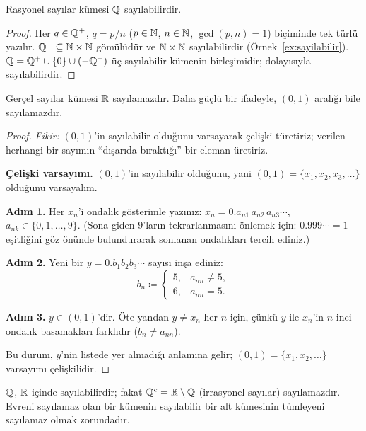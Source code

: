 \begin{teorem}[$\Q$ Sayılabilirdir]\label{thm:Qsayilabilir}
Rasyonel sayılar kümesi $\Q$ sayılabilirdir.
\end{teorem}

\begin{proof}
Her $q \in \mathbb{Q}^+$, $q = p/n$ ($p \in \mathbb{N}$, $n \in \mathbb{N}$, $\gcd(p,n) = 1$) biçiminde
tek türlü yazılır. $\mathbb{Q}^+ \subseteq \mathbb{N} \times \mathbb{N}$ gömülüdür ve $\mathbb{N} \times \mathbb{N}$
sayılabilirdir (Örnek~\ref{ex:sayilabilir}). $\mathbb{Q} = \mathbb{Q}^+ \cup \{0\} \cup (-\mathbb{Q}^+)$
üç sayılabilir kümenin birleşimidir; dolayısıyla sayılabilirdir.
\end{proof}

\begin{teorem}
\label{thm:Rsayilamaz}
Gerçel sayılar kümesi $\mathbb{R}$ sayılamazdır.
Daha güçlü bir ifadeyle, $(0,1)$ aralığı bile sayılamazdır.
\end{teorem}

\begin{proof}
\textit{Fikir:} $(0,1)$'in sayılabilir olduğunu varsayarak çelişki türetiriz;
verilen herhangi bir sayımın ``dışarıda bıraktığı'' bir eleman üretiriz.

\medskip

\textbf{Çelişki varsayımı.} $(0,1)$'in sayılabilir olduğunu, yani
$(0,1) = \{x_1, x_2, x_3, \ldots\}$ olduğunu varsayalım.

\textbf{Adım 1.} Her $x_n$'i ondalık gösterimle yazınız:
$x_n = 0.a_{n1}\,a_{n2}\,a_{n3}\cdots$, $a_{nk} \in \{0,1,\ldots,9\}$.
(Sona giden $9$'ların tekrarlanmasını önlemek için: $0.999\cdots = 1$ eşitliğini
göz önünde bulundurarak sonlanan ondalıkları tercih ediniz.)

\textbf{Adım 2.} Yeni bir $y = 0.b_1 b_2 b_3 \cdots$ sayısı inşa ediniz:
\[
  b_n \coloneqq
  \begin{cases}
    5, & a_{nn} \neq 5, \\
    6, & a_{nn} = 5.
  \end{cases}
\]

\textbf{Adım 3.} $y \in (0,1)$'dir. Öte yandan $y \neq x_n$ her $n$ için,
çünkü $y$ ile $x_n$'in $n$-inci ondalık basamakları farklıdır ($b_n \neq a_{nn}$).

Bu durum, $y$'nin listede yer almadığı anlamına gelir; $(0,1) = \{x_1, x_2, \ldots\}$
varsayımı çelişkilidir.
\end{proof}

\begin{karsiornek}
$\Q$, $\mathbb{R}$ içinde sayılabilirdir; fakat $\mathbb{Q}^c = \mathbb{R} \setminus \mathbb{Q}$
(irrasyonel sayılar) sayılamazdır. Evreni sayılamaz olan bir kümenin
sayılabilir bir alt kümesinin tümleyeni sayılamaz olmak zorundadır.
\end{karsiornek}

